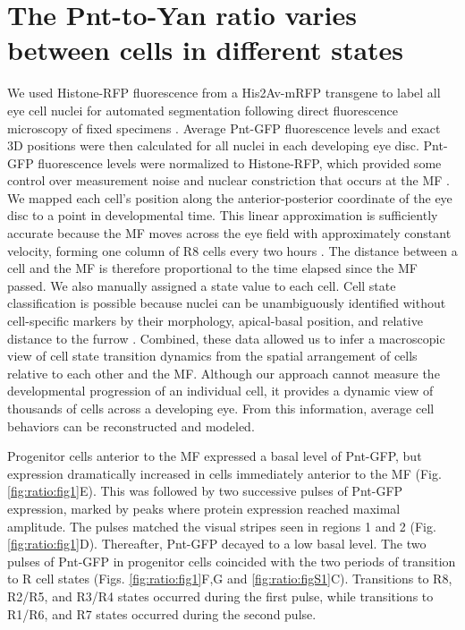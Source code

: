 \begin{figure}[h!]
\end{figure}

\section{The Pnt-to-Yan ratio varies between cells in different states }

We used Histone-RFP fluorescence from a His2Av-mRFP transgene to label all eye cell nuclei for automated segmentation following direct fluorescence microscopy of fixed specimens \cite{Pelaez2015a,Pelaez2016}. Average Pnt-GFP fluorescence levels and exact 3D positions were then calculated for all nuclei in each developing eye disc. Pnt-GFP fluorescence levels were normalized to Histone-RFP, which provided some control over measurement noise and nuclear constriction that occurs at the MF \cite{Pelaez2015a,Pelaez2016}. We mapped each cell's position along the anterior-posterior coordinate of the eye disc to a point in developmental time. This linear approximation is sufficiently accurate because the MF moves across the eye field with approximately constant velocity, forming one column of R8 cells every two hours \cite{Basler1989,Campos-Ortega1977}. The distance between a cell and the MF is therefore proportional to the time elapsed since the MF passed. We also manually assigned a state value to each cell. Cell state classification is possible because nuclei can be unambiguously identified without cell-specific markers by their morphology, apical-basal position, and relative distance to the furrow \cite{Ready1976a,Tomlinson1985,Tomlinson1987a,Wolff1993,Pelaez2015a,Pelaez2016}. Combined, these data allowed us to infer a macroscopic view of cell state transition dynamics from the spatial arrangement of cells relative to each other and the MF. Although our approach cannot measure the developmental progression of an individual cell, it provides a dynamic view of thousands of cells across a developing eye. From this information, average cell behaviors can be reconstructed and modeled.

Progenitor cells anterior to the MF expressed a basal level of Pnt-GFP, but expression dramatically increased in cells immediately anterior to the MF (Fig. \ref{fig:ratio:fig1}E). This was followed by two successive pulses of Pnt-GFP expression, marked by peaks where protein expression reached maximal amplitude. The pulses matched the visual stripes seen in regions 1 and 2 (Fig. \ref{fig:ratio:fig1}D). Thereafter, Pnt-GFP decayed to a low basal level. The two pulses of Pnt-GFP in progenitor cells coincided with the two periods of transition to R cell states (Figs. \ref{fig:ratio:fig1}F,G and \ref{fig:ratio:figS1}C). Transitions to R8, R2/R5, and R3/R4 states occurred during the first pulse, while transitions to R1/R6, and R7 states occurred during the second pulse.

